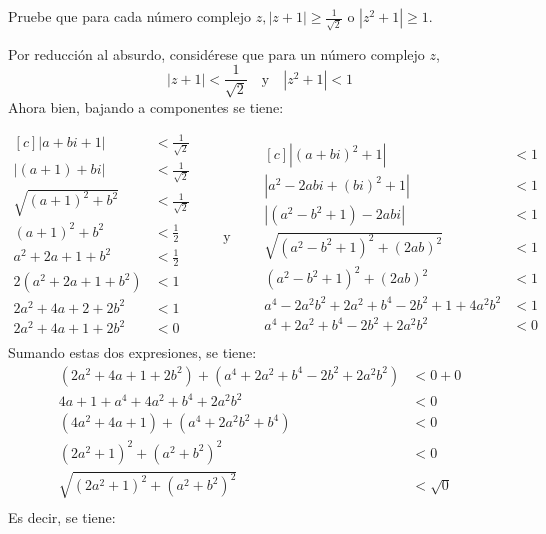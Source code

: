 \begin{problema}
    Pruebe que para cada número complejo $z,|z+1| \geq \frac{1}{\sqrt{2}}$ o $\left|z^{2}+1\right| \geq 1$.
    \begin{sol}
        Por reducción al absurdo, considérese que para un número complejo $z$,  
        $$|z+1| <\frac{1}{\sqrt{2}}\quad\text{y}\quad\left|z^{2}+1\right| <1$$
        Ahora bien, bajando a componentes se tiene: 
        
        \begin{equation*}
            \begin{aligned}[c]
                |a+bi+1| &<\frac{1}{\sqrt{2}}\\
                |(a+1)+bi| &<\frac{1}{\sqrt{2}}\\
                \sqrt{(a+1)^2 + b^2} &<\frac{1}{\sqrt{2}}\\
                (a+1)^2 + b^2 &<\frac{1}{2}\\
                a^2+2a+1 +b^2 &<\frac{1}{2}\\
                2(a^2+2a+1 +b^2) &<1\\
                2a^2+4a+2 +2b^2 &<1\\
                2a^2+4a+1 +2b^2 &<0\\
            \end{aligned}
            \qquad\text{y}\qquad
            \begin{aligned}[c]
                \left|(a+bi)^{2}+1\right| &<1\\
                \left|a^2-2abi+(bi)^2+1\right| &<1\\
                \left|(a^2-b^2+1)-2abi\right| &<1\\
                \sqrt{(a^2-b^2+1)^2 +(2ab)^2} &<1\\
                (a^2-b^2+1)^2 +(2ab)^2 &<1\\
                a^{4}-2 a^{2} b^{2}+2 a^{2}+b^{4}-2 b^{2}+1 + 4a^2b^2 &<1\\
                a^{4}+2 a^{2}+b^{4}-2 b^{2}+ 2a^2b^2 &<0
            \end{aligned}
            \end{equation*}
            Sumando estas dos expresiones, se tiene:
            \begin{align*}
                (2a^2+4a+1 +2b^2)+(a^{4}+2 a^{2}+b^{4}-2 b^{2}+ 2a^2b^2) &< 0+0\\
                4a+1+a^{4}+4a^{2}+b^{4}+ 2a^2b^2 &< 0\\
                (4a^{2}+4a+1)+ (a^{4}+2a^2b^2 +b^{4})&< 0\\
                (2a^2+1)^2+ (a^2+b^2)^2&< 0\\
                \sqrt{(2a^2+1)^2+ (a^2+b^2)^2}&< \sqrt{0}\\
            \end{align*}
            Es decir, se tiene: 


\end{sol}
\end{problema}
